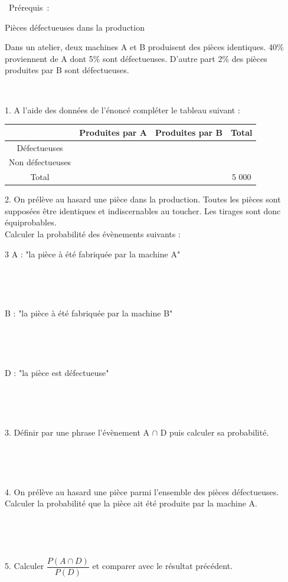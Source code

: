 \documentclass[11pt,a4paper]{article}
\newcommand{\bpre}[1]
{\begin{bclogo}[couleur = white,logo=\bcinfo , arrondi = 0.1]
{~\normalsize Prérequis~:}
~~
{#1}
~~
\end{bclogo}}
\newcommand{\cadre}[1]
{\begin{bclogo}[couleur = white,logo=,  arrondi = 0.1,barre=none]
~~
{%
\rule{0mm}{#1mm}}\par
\medskip
~~
\end{bclogo}}
\begin{document}
\vfill

\bpre{Pièces défectueuses dans la production 

Dans un atelier, deux machines A et B produisent des pièces identiques. 40\% proviennent de A dont 5\% sont défectueuses. D'autre part 2\% des pièces produites par B sont défectueuses.  \\[2 pt] }

1. A l'aide des données de l'énoncé compléter le tableau suivant :\\
\begin{center}
\begin{tabular} { | c | c | c | c | }
   \hline
 \rowcolor{white}     & Produites par A & Produites par B & Total \\
   \hline 
 \rowcolor{white}  Défectueuses  & ~~ & ~~& ~~\\
   \hline
\rowcolor{white}   Non défectueuses   & ~~& ~~& ~~\\
   \hline
\rowcolor{white}   Total  & ~~& ~~ & 5 000  \\
   \hline
 \end{tabular}
\end{center}
 
\vspace{5pt}

2. On prélève au hasard une pièce dans la production. Toutes les pièces sont supposées être identiques et indiscernables au toucher. Les tirages sont donc équiprobables. \\[2 pt]
Calculer la probabilité des évènements suivants :
\begin{multicols}{3}
A : "la pièce à été fabriquée par la machine A"\\[2 pt]
\cadre{1}
B : "la pièce à été fabriquée par la machine B"\\[2 pt]
\cadre{1}
D : "la pièce est défectueuse"\\[2 pt]
\cadre{4}
\end{multicols}


3. Définir par une phrase l'évènement A $\cap$ D puis calculer sa probabilité.\\[2 pt]
\cadre{2}




4. On prélève au hasard une pièce parmi l'ensemble des pièces défectueuses. Calculer la probabilité que la pièce ait été produite par la machine A. \\[2 pt]
\cadre{15}

5. Calculer $\dfrac{P(A \cap D)}{P(D)}$ et comparer avec le résultat précédent.\\[2 pt]
\cadre{5}
\end{document}
